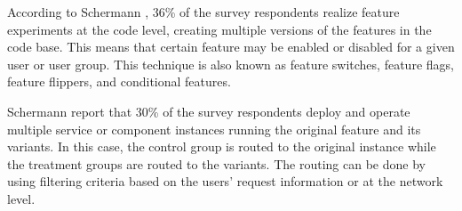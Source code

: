 \begin{description}[style=unboxed,leftmargin=0pt,font=\normalsize\bfseries]
	\item[Feature toggles\autodot] According to Schermann \etal{}, 36\% of the survey respondents realize feature experiments at the code level, creating multiple versions of the features in the code base. This means that certain feature may be enabled or disabled for a given user or user group. This technique is also known as feature switches, feature flags, feature flippers, and conditional features. 




	\item[Runtime traffic routing\autodot] Schermann \etal{} report that 30\% of the survey respondents deploy and operate multiple service or component instances running the original feature and its variants. In this case, the control group is routed to the original instance while the treatment groups are routed to the variants. The routing can be done by using filtering criteria based on the users' request information or at the network level.

\end{description}

